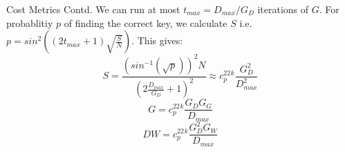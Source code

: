 \begin{frame}{Cost Metrics Contd.}
    We can run at most $t_{max} = D_{max}/G_D$ iterations of $G$. \pause For probablitiy $p$ of finding the correct key, we calculate $S$ i.e. $p = sin^2((2t_{max} + 1)\sqrt{\frac{S}{N}})$. This gives: \pause
    \begin{equation}\label{eq:S}
    S = \frac{(sin^{-1}(\sqrt{p}))^2N}{(2\frac{D_{max}}{G_D} + 1)^2} \approx c_p^22^k\frac{G_D^2}{D^2_{max}}
\end{equation}
\pause
\begin{equation}\label{eq:G}
    G = c_p^22^k\frac{G_DG_G}{D_{max}}
\end{equation}
\pause
\begin{equation}\label{eq:DW2}
    DW = c_p^22^k\frac{G_D^2G_W}{D_{max}}
\end{equation}
\end{frame}